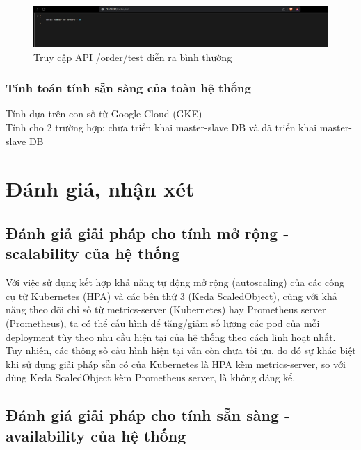 \begin{figure}[H]
  \begin{center}
      \includegraphics[scale = 0.6]{images/hanh/order-test-api-show}
      \vspace*{1mm}
  \end{center}
  \caption{Truy cập API /order/test diễn ra bình thường}
  \label{fig:order-test-api-show}

\end{figure}
\subsubsection{Tính toán tính sẵn sàng của toàn hệ thống}
Tính dựa trên con số từ Google Cloud (GKE)\\
Tính cho 2 trường hợp: chưa triển khai master-slave DB và đã triển khai master-slave DB
\section{Đánh giá, nhận xét}
\subsection{Đánh giả giải pháp cho tính mở rộng - scalability của hệ thống}
\noindent Với việc sử dụng kết hợp khả năng tự động mở rộng (autoscaling) của các công cụ từ Kubernetes (HPA) và các bên thứ 3 (Keda ScaledObject), cùng với khả năng theo dõi chỉ số từ metrics-server (Kubernetes) hay Prometheus server (Prometheus), ta có thể cấu hình để tăng/giảm số lượng các pod của mỗi deployment tùy theo nhu cầu hiện tại của hệ thống theo cách linh hoạt nhất.\\[0.5cm]
Tuy nhiên, các thông số cấu hình hiện tại vẫn còn chưa tối ưu, do đó sự khác biệt khi sử dụng giải pháp sẵn có của Kubernetes là HPA kèm metrics-server, so với dùng Keda ScaledObject kèm Prometheus server, là không đáng kể. 
\subsection{Đánh giá giải pháp cho tính sẵn sàng - availability của hệ thống}
